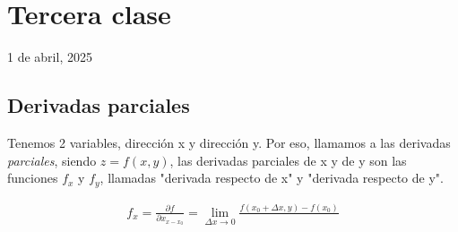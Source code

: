 \section{Tercera clase}

1 de abril, 2025

\subsection{Derivadas parciales}

Tenemos 2 variables,
dirección x y dirección y.
Por eso,
llamamos a las derivadas \textit{parciales},
siendo \(z = f(x,y)\),
las derivadas parciales de x y de y son las funciones \(f_x\) y \(f_y\),
llamadas "derivada respecto de x"
y "derivada respecto de y".

\begin{align*}
    f_x = \frac{\partial f}{\partial x_{x-x_0}} = \lim_{\Delta x \to 0}\frac{f(x_0 + \Delta x, y) - f(x_0)}{}
\end{align*}